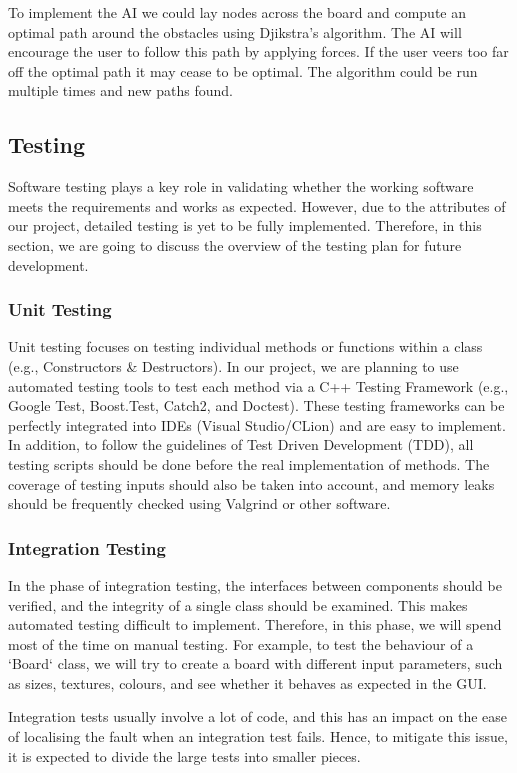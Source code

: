 \documentclass[a4paper]{article}
\begin{document}
To implement the AI we could lay nodes across the board and compute an optimal path around the obstacles using Djikstra’s algorithm. The AI will encourage the user to follow this path by applying forces. If the user veers too far off the optimal path it may cease to be optimal. The algorithm could be run multiple times and new paths found.


\subsection{Testing}
Software testing plays a key role in validating whether the working software meets the requirements and works as expected. However, due to the attributes of our project, detailed testing is yet to be fully implemented. Therefore, in this section, we are going to discuss the overview of the testing plan for future development.

\subsubsection*{Unit Testing}
Unit testing focuses on testing individual methods or functions within a class (e.g., Constructors \& Destructors). In our project, we are planning to use automated testing tools to test each method via a C++ Testing Framework (e.g., Google Test, Boost.Test, Catch2, and Doctest). These testing frameworks can be perfectly integrated into IDEs (Visual Studio/CLion) and are easy to implement. In addition, to follow the guidelines of Test Driven Development (TDD), all testing scripts should be done before the real implementation of methods. The coverage of testing inputs should also be taken into account, and memory leaks should be frequently checked using Valgrind or other software. 

\subsubsection*{Integration Testing}
In the phase of integration testing, the interfaces between components should be verified, and the integrity of a single class should be examined. This makes automated testing difficult to implement. Therefore, in this phase, we will spend most of the time on manual testing. For example, to test the behaviour of a `Board` class, we will try to create a board with different input parameters, such as sizes, textures, colours, and see whether it behaves as expected in the GUI.

Integration tests usually involve a lot of code, and this has an impact on the ease of localising the fault when an integration test fails. Hence, to mitigate this issue, it is expected to divide the large tests into smaller pieces.
\end{document}
